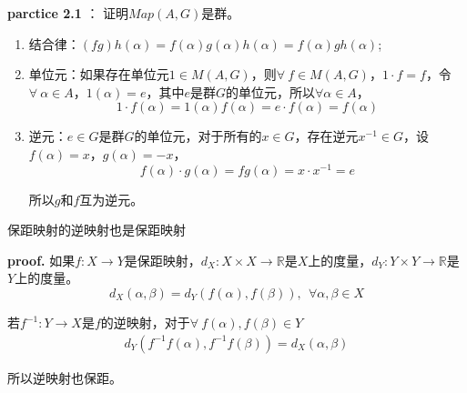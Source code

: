 \begin{mdframed}
    \textbf{parctice 2.1} ： 证明$Map(A,G)$是群。
    \begin{enumerate}
        \item 结合律：$(fg)h(\alpha)=f(\alpha)g(\alpha)h(\alpha)=f(\alpha)gh(\alpha)$;
        \item 单位元：如果存在单位元$1\in M(A,G)$，则$\forall\ f\in M(A,G)$，$1\cdot f=f$，令$\forall\ \alpha\in A$，$1(\alpha)=e$，其中$e$是群$G$的单位元，所以$\forall \alpha\in A$，
        \begin{equation}
            1\cdot f(\alpha)=1(\alpha)f(\alpha)=e\cdot f(\alpha)=f(\alpha)
        \end{equation}
        \item 逆元：$e\in G$是群$G$的单位元，对于所有的$x\in G$，存在逆元$x^{-1}\in G$，设$f(\alpha)=x$，$g(\alpha)=-x$，
        \begin{equation}
            f(\alpha)\cdot g(\alpha)=fg(\alpha)=x\cdot x^{-1}=e
        \end{equation}

        所以$g$和$f$互为逆元。
    \end{enumerate}

\end{mdframed}

\begin{mdframed}
    \begin{lemma}
        保距映射的逆映射也是保距映射
    \end{lemma}

    \textbf{proof.} 如果$f:X\rightarrow Y$是保距映射，$d_X:X\times X\rightarrow \mathbb{R}$是$X$上的度量，$d_Y:Y\times Y\rightarrow \mathbb{R}$是$Y$上的度量。
    \begin{equation}
        d_X(\alpha,\beta)=d_Y(f(\alpha),f(\beta)),\ \ \forall\alpha,\beta\in X
    \end{equation}

    若$f^{-1}:Y\rightarrow X$是$f$的逆映射，对于$\forall\ f(\alpha),f(\beta)\in Y$
    \begin{equation}
        \begin{aligned}
            d_Y(f^{-1}f(\alpha),f^{-1}f(\beta))=d_X(\alpha,\beta)
        \end{aligned}
    \end{equation}

    所以逆映射也保距。

\end{mdframed}

